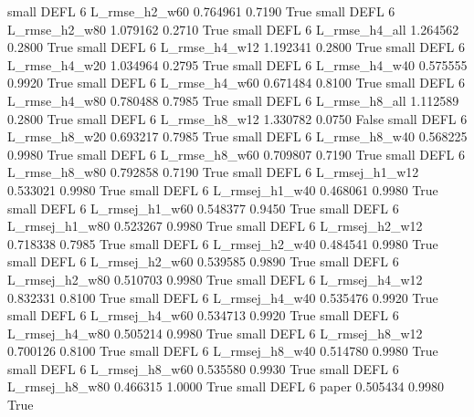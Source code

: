      small     DEFL                 6  L_rmse_h2_w60   0.764961      0.7190    True
     small     DEFL                 6  L_rmse_h2_w80   1.079162      0.2710    True
     small     DEFL                 6  L_rmse_h4_all   1.264562      0.2800    True
     small     DEFL                 6  L_rmse_h4_w12   1.192341      0.2800    True
     small     DEFL                 6  L_rmse_h4_w20   1.034964      0.2795    True
     small     DEFL                 6  L_rmse_h4_w40   0.575555      0.9920    True
     small     DEFL                 6  L_rmse_h4_w60   0.671484      0.8100    True
     small     DEFL                 6  L_rmse_h4_w80   0.780488      0.7985    True
     small     DEFL                 6  L_rmse_h8_all   1.112589      0.2800    True
     small     DEFL                 6  L_rmse_h8_w12   1.330782      0.0750   False
     small     DEFL                 6  L_rmse_h8_w20   0.693217      0.7985    True
     small     DEFL                 6  L_rmse_h8_w40   0.568225      0.9980    True
     small     DEFL                 6  L_rmse_h8_w60   0.709807      0.7190    True
     small     DEFL                 6  L_rmse_h8_w80   0.792858      0.7190    True
     small     DEFL                 6 L_rmsej_h1_w12   0.533021      0.9980    True
     small     DEFL                 6 L_rmsej_h1_w40   0.468061      0.9980    True
     small     DEFL                 6 L_rmsej_h1_w60   0.548377      0.9450    True
     small     DEFL                 6 L_rmsej_h1_w80   0.523267      0.9980    True
     small     DEFL                 6 L_rmsej_h2_w12   0.718338      0.7985    True
     small     DEFL                 6 L_rmsej_h2_w40   0.484541      0.9980    True
     small     DEFL                 6 L_rmsej_h2_w60   0.539585      0.9890    True
     small     DEFL                 6 L_rmsej_h2_w80   0.510703      0.9980    True
     small     DEFL                 6 L_rmsej_h4_w12   0.832331      0.8100    True
     small     DEFL                 6 L_rmsej_h4_w40   0.535476      0.9920    True
     small     DEFL                 6 L_rmsej_h4_w60   0.534713      0.9920    True
     small     DEFL                 6 L_rmsej_h4_w80   0.505214      0.9980    True
     small     DEFL                 6 L_rmsej_h8_w12   0.700126      0.8100    True
     small     DEFL                 6 L_rmsej_h8_w40   0.514780      0.9980    True
     small     DEFL                 6 L_rmsej_h8_w60   0.535580      0.9930    True
     small     DEFL                 6 L_rmsej_h8_w80   0.466315      1.0000    True
     small     DEFL                 6          paper   0.505434      0.9980    True

